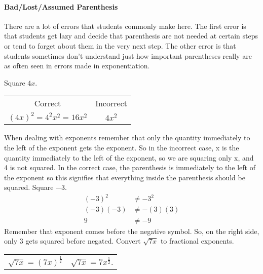 \paragraph*{Bad/Lost/Assumed Parenthesis} There are a lot of errors that students commonly make here. The first error is that
students get lazy and decide that parenthesis are not needed at certain steps or tend to
forget about them in the very next step. The other error is that students sometimes don't
understand just how important parentheses really are as often seen in errors made in
exponentiation.
\begin{example}
\item Square $4x$.
\begin{center}
\begin{tabular}{cc}
Correct & Incorrect\\
$(4x)^2=4^2x^2=16x^2$ & $4x^2$\\
\end{tabular}
\end{center}
When dealing with exponents remember that only the quantity immediately to the
left of the exponent gets the exponent. So in the incorrect case, x is the quantity
immediately to the left of the exponent, so we are squaring only x, and 4 is not squared. In
the correct case, the parenthesis is immediately to the left of the exponent so this signifies
that everything inside the parenthesis should be squared.
\Item Square $-3$.
\begin{align*}
(-3)^2&\neq -3^2\\
(-3)(-3)&\neq -(3)(3)\\
9&\neq-9
\end{align*}
Remember that exponent comes before the negative symbol. So, on the right side,
only 3 gets squared before negated.
\Item Convert $\sqrt{7x}$ to fractional exponents.
\begin{center}
\begin{tabular}{cc}
$\sqrt{7x}=(7x)^\frac{1}{2}$ & $\sqrt{7x}=7x^\frac{1}{2}$.
\end{tabular}
\end{center}
\end{example}
